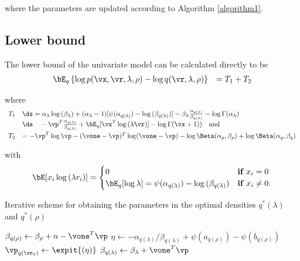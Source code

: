 
\noindent where the parameters are updated according to Algorithm \ref{algorithm1}. 

\subsection{Lower bound}
The lower bound of the univariate model can be calculated directly to be
$$
\begin{array}{rl}
\bE_q \left\{ \log{p(\vx, \vr, \lambda, \rho)} - \log{q(\vr, \lambda, \rho)} \right\} &= T_1 + T_2 \\
\end{array}
$$

\noindent where
$$
\begin{array}{rl}
T_1 & \ds =
\alpha_\lambda \log{(\beta_\lambda)} + (\alpha_\lambda - 1) [\psi(\alpha_{q(\lambda)}) - \log{(\beta_{q(\lambda)})}] - \beta_\lambda \frac{\alpha_{q(\lambda)}}{\beta_{q(\lambda)}} - \log\Gamma(\alpha_\lambda) \\
& \ds \quad -\vp^T\frac{\alpha_{q(\lambda)}}{\beta_{q(\lambda)}} + \bE_q[\vx^T \log{(\lambda \vr)}] - \log\Gamma(\vx+1)) \quad \mbox{and} 
\\ [1ex]
T_2 &= - \vp^T \log \vp - (\vone - \vp)^T \log (\vone - \vp) - \log \Beta (\alpha_\rho, \beta_\rho) + \log \Beta (\alpha_q, \beta_q)
\end{array}
$$

\noindent with 
$$
\bE [x_i \log{(\lambda r_i)}]  =
	\begin{cases}
	0 & \textbf{if } x_i = 0 \\
	\bE_q [\log \lambda] = \psi(\alpha_{q(\lambda)}) - \log{(\beta_{q(\lambda)})} & \textbf{if } x_i \ne 0. \\
	\end{cases}
$$

\begin{algorithm} 
\caption[Algorithm 1]{Iterative scheme for obtaining the parameters in the
optimal densities $q^*(\lambda)$ and $q^*(\rho)$}
\begin{algorithmic}
\STATE $\beta_{q(\rho)} \leftarrow \beta_\rho + n - \vone^T\vp$
\STATE $\eta \leftarrow -\alpha_{q(\lambda)}/\beta_{q(\lambda)} + \psi{(a_{q{(\rho)}})} - \psi{(b_{q{(\rho)}})}$
\STATE $\vp_{q(\vr_0)} \leftarrow \expit{(\eta)}$
\STATE $\beta_{q(\lambda)} \leftarrow \beta_\lambda + \vone^T\vp$
\ENDWHILE
\end{algorithmic}
\label{algorithm1}
\end{algorithm}



